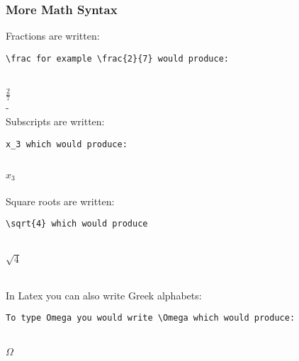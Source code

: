 \documentclass[aspectratio=1610]{beamer}
\begin{document}
\begin{frame}[fragile]
    \frametitle{More Math Syntax}
    Fractions are written: 
    \\
    \begin{verbatim}
\frac for example \frac{2}{7} would produce:

\end{verbatim}
\\
$\frac{2}{7}$
\\ - \\
Subscripts are written:
\\
\begin{verbatim}
x_3 which would produce:
\end{verbatim}
\\
$x_3$
\\ \\
Square roots are written: 
\begin{verbatim}
\sqrt{4} which would produce

\end{verbatim}
  \\
  $\sqrt{4}$

  \\
  In Latex you can also write Greek alphabets:
    \begin{verbatim}
To type Omega you would write \Omega which would produce:
\end{verbatim}
\\
$\Omega$
\\

\end{frame}
\end{document}
